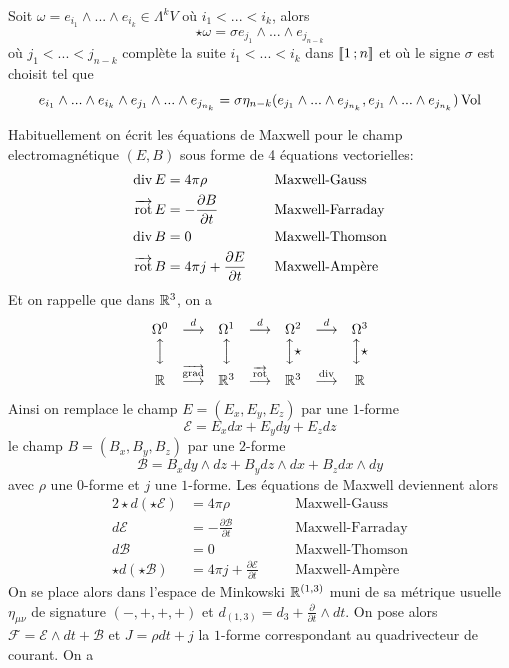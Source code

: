 \documentclass[12pt, a4paper]{book}
\begin{document}
\begin{pro}
Soit $\omega = e_{i_1}\wedge ... \wedge e_{i_k} \in \Lambda^kV$ où $i_1 < ... < i_k$, alors 
$$\star \omega = \sigma e_{j_1} \wedge ... \wedge e_{j_{n-k}}$$
où $j_1 < ... < j_{n-k}$ complète la suite $i_1 < ... < i_k$ dans $[\![1 \,; n]\!]$ et où le signe $\sigma$ est choisit tel que 
$$e_{i_1} \wedge ... \wedge e_{i_k} \wedge e_{j_1} \wedge ... \wedge e_{j_{n_k}} = \sigma \eta_{n-k}(e_{j_1} \wedge ... \wedge e_{j_{n_k}}, e_{j_1} \wedge ... \wedge e_{j_{n_k}})\operatorname{Vol} $$ 
\end{pro}


Habituellement on écrit les équations de Maxwell pour le champ electromagnétique $(E, B)$ sous forme de 4 équations vectorielles:
\begin{alignat*}{2}
\operatorname{div} E & =  4\pi\rho  && \quad\text{Maxwell-Gauss} \\
\operatorname{\overrightarrow{\text{rot}}} E & = - \frac{\partial B}{\partial t}  && \quad\text{Maxwell-Farraday} \\
\operatorname{div} B & =  0 && \quad\text{Maxwell-Thomson} \\
\operatorname{\overrightarrow{\text{rot}}} B & =  4\pi j + \frac{\partial E}{\partial t}  &&\quad\text{Maxwell-Ampère}
\end{alignat*}
Et on rappelle que dans $\mathbb{R}^3$, on a
$$\begin{matrix}
\Omega^0 & \overset{d}{\longrightarrow} & \Omega^1 & \overset{d}{\longrightarrow} & \Omega^2 & \overset{d}{\longrightarrow} & \Omega^3\\
\Big\updownarrow &  & \Big\updownarrow &  & \Big\updownarrow\star &  & \Big\updownarrow\star\\
\mathbb{R} & \overset{\operatorname{\overrightarrow{\text{grad}}}}{\longrightarrow} & \mathbb{R}^3 & \overset{\operatorname{\overrightarrow{\text{rot}}}}{\longrightarrow} & \mathbb{R}^3 & \overset{\operatorname{div}}{\longrightarrow} & \mathbb{R}
\end{matrix}
$$
Ainsi on remplace le champ $E = (E_x, E_y, E_z)$ par une $1$-forme 
$$\mathscr{E} = E_x dx + E_y dy + E_z dz$$ 
le champ $B = (B_x, B_y, B_z)$ par une $2$-forme 
$$\mathscr{B} = B_x dy\wedge dz + B_y dz \wedge dx + B_z dx\wedge dy$$
avec $\rho$ une $0$-forme et $j$ une $1$-forme. Les équations de Maxwell deviennent alors
\begin{alignat*}{2}
\star d(\star\mathscr{E}) & =  4\pi\rho  && \quad\text{Maxwell-Gauss} \\
d \mathscr{E} & = - \frac{\partial \mathscr{B}}{\partial t}  && \quad\text{Maxwell-Farraday} \\
d \mathscr{B} & =  0 && \quad\text{Maxwell-Thomson} \\
\star d(\star\mathscr{B}) & =  4\pi j + \frac{\partial \mathscr{E}}{\partial t}  &&\quad\text{Maxwell-Ampère}
\end{alignat*}
On se place alors dans l'espace de Minkowski $\mathbb{R}^{(1, 3)}$ muni de sa métrique usuelle $\eta_{\mu\nu}$ de signature $(-,+,+,+)$ et $d_{(1,3)} = d_3 + \frac{\partial}{\partial t}\wedge dt$. On pose alors $\mathscr{F} = \mathscr{E} \wedge dt + \mathscr{B}$ et $J = \rho dt + j$ la $1$-forme correspondant au quadrivecteur de courant. On a
\end{document}
